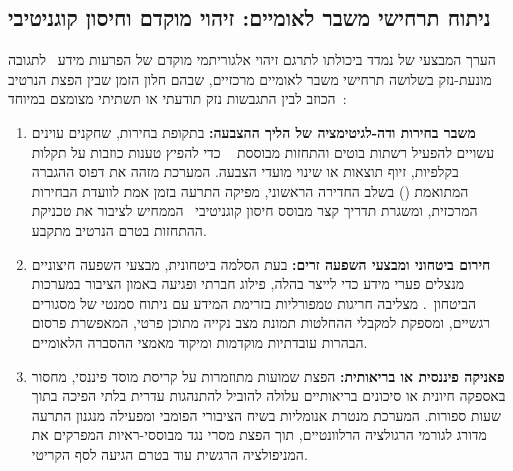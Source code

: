 \subsection{ניתוח תרחישי משבר לאומיים: זיהוי מוקדם וחיסון קוגניטיבי}
\label{sec:crisis_scenarios}

הערך המבצעי של  נמדד ביכולתו לתרגם זיהוי אלגוריתמי מוקדם של הפרעות מידע~\cite{wardle2017information} לתגובה מונעת-נזק בשלושה תרחישי משבר לאומיים מרכזיים, שבהם חלון הזמן שבין הפצת הנרטיב הכוזב לבין התגבשות נזק תודעתי או תשתיתי מצומצם במיוחד~\cite{nimmo2020breakout}:

\begin{enumerate}
    \item \textbf{משבר בחירות ודה-לגיטימציה של הליך ההצבעה:} בתקופת בחירות, שחקנים עוינים עשויים להפעיל רשתות בוטים והתחזות מבוססת ~\cite{goldstein2023generative} כדי להפיץ טענות כוזבות על תקלות בקלפיות, זיוף תוצאות או שינוי מועדי הצבעה. המערכת מזהה את דפוס ההגברה המתואמת () בשלב החדירה הראשוני, מפיקה התרעה בזמן אמת לוועדת הבחירות המרכזית, ומשגרת תדריך  קצר מבוסס חיסון קוגניטיבי~\cite{roozenbeek2022psychological,lewandowsky2021countering} הממחיש לציבור את טכניקת ההתחזות בטרם הנרטיב מתקבע.

    \item \textbf{חירום ביטחוני ומבצעי השפעה זרים:} בעת הסלמה ביטחונית, מבצעי השפעה חיצוניים מנצלים פערי מידע כדי לייצר בהלה, פילוג חברתי ופגיעה באמון הציבור במערכות הביטחון~\cite{bennett2018disinformation}.  מצליבה חריגות טמפורליות בזרימת המידע עם ניתוח סמנטי של מסגורים רגשיים, ומספקת למקבלי ההחלטות תמונת מצב נקייה מתוכן פרטי, המאפשרת פרסום הבהרות עובדתיות מוקדמות ומיקוד מאמצי ההסברה הלאומיים.

    \item \textbf{פאניקה פיננסית או בריאותית:} הפצת שמועות מתוזמרות על קריסת מוסד פיננסי, מחסור באספקה חיונית או סיכונים בריאותיים עלולה להוביל להתנהגות עדרית בלתי הפיכה בתוך שעות ספורות. המערכת מנטרת אנומליות בשיח הציבורי הפומבי ומפעילה מנגנון התרעה מדורג לגורמי הרגולציה הרלוונטיים, תוך הפצת מסרי נגד מבוססי-ראיות המפרקים את המניפולציה הרגשית עוד בטרם הגיעה לסף הקריטי.
\end{enumerate}

